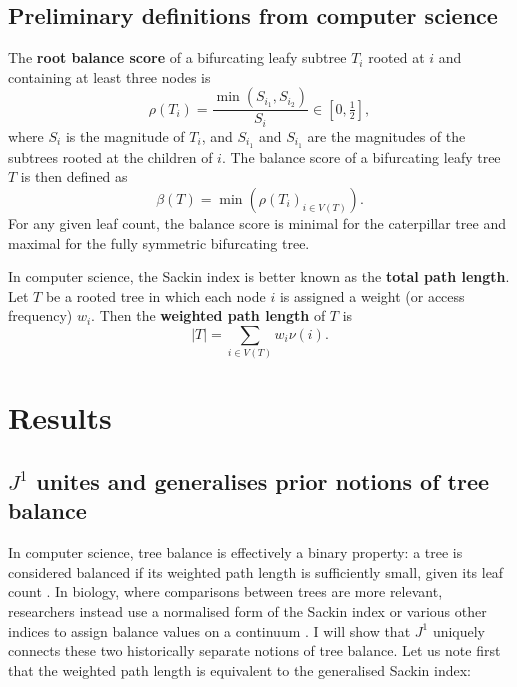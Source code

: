 \subsection{Preliminary definitions from computer science}\label{compscisec}

\begin{definition}
    The \textbf{root balance score} of a bifurcating leafy subtree $T_i$ rooted
    at $i$ and containing at least three nodes is
    \begin{equation}
        \rho(T_i) = \frac{\min(S_{i_1}, S_{i_2})}{S_i} \in \left[0, \tfrac{1}{2}\right],
    \end{equation}
    where $S_i$ is the magnitude of $T_i$, and $S_{i_1}$ and $S_{i_1}$ are the
    magnitudes of the subtrees rooted at the children of $i$. The balance score
    of a bifurcating leafy tree $T$ is then defined as
    \begin{equation}\label{defballeafy}
        \beta(T) = \min\left( \rho(T_i)_{i\in V(T)} \right).
    \end{equation}
    For any given leaf count, the balance score is minimal for the caterpillar
    tree and maximal for the fully symmetric bifurcating tree.
\end{definition}

\begin{definition}
    In computer science, the Sackin index is better known as the \textbf{total path length}.
    Let $T$ be a rooted tree in which each node $i$ is assigned a weight
    (or access frequency) $w_i$. Then the \textbf{weighted path length} of $T$ is
    \begin{equation}\label{wpathdef}
        |T| = \sum_{i \in V(T)} w_i \nu(i).
    \end{equation}
\end{definition}


\section{Results}


\subsection{$J^1$ unites and generalises prior notions of tree balance}

In computer science, tree balance is effectively a binary property: a tree is
considered balanced if its weighted path length is sufficiently small, given its
leaf count \citep{nievergelt_binary_1972}. In biology, where comparisons between
trees are more relevant, researchers instead use a normalised form of the Sackin
index or various other indices to assign balance values on a continuum
\citep{Colless1982, Shao1990, mir_new_2013, mir_sound_2018, fischer_tree_2021}.
I will show that $J^1$ uniquely connects these two historically separate
notions of tree balance.
Let us note first that the weighted path length is equivalent to the generalised Sackin index:

